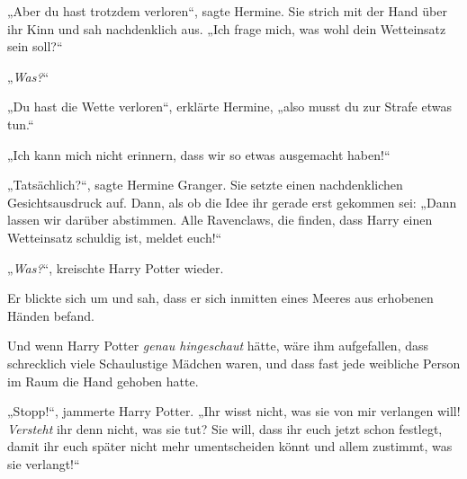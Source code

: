 „Aber du hast trotzdem verloren“, sagte Hermine. Sie strich mit der Hand über ihr Kinn und sah nachdenklich aus. „Ich frage mich, was wohl dein Wetteinsatz sein soll?“

„\emph{Was?}“

„Du hast die Wette verloren“, erklärte Hermine, „also musst du zur Strafe etwas tun.“

„Ich kann mich nicht erinnern, dass wir so etwas ausgemacht haben!“

„Tatsächlich?“, sagte Hermine Granger. Sie setzte einen nachdenklichen Gesichtsausdruck auf. Dann, als ob die Idee ihr gerade erst gekommen sei: „Dann lassen wir darüber abstimmen. Alle Ravenclaws, die finden, dass Harry einen Wetteinsatz schuldig ist, meldet euch!“

„\emph{Was?}“, kreischte Harry Potter wieder.

Er blickte sich um und sah, dass er sich inmitten eines Meeres aus erhobenen Händen befand.

Und wenn Harry Potter \emph{genau hingeschaut} hätte, wäre ihm aufgefallen, dass schrecklich viele Schaulustige Mädchen waren, und dass fast jede weibliche Person im Raum die Hand gehoben hatte.

„Stopp!“, jammerte Harry Potter. „Ihr wisst nicht, was sie von mir verlangen will! \emph{Versteht} ihr denn nicht, was sie tut? Sie will, dass ihr euch jetzt schon festlegt, damit ihr euch später nicht mehr umentscheiden könnt und allem zustimmt, was sie verlangt!“

